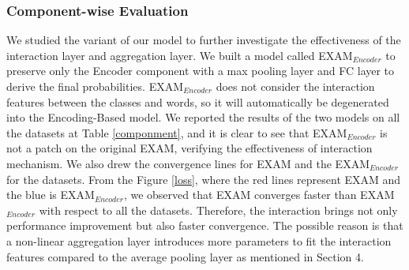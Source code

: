 \documentclass[letterpaper]{article} %
\begin{document}
\subsubsection{Component-wise Evaluation}
We studied the variant of our model to further investigate the effectiveness of the interaction layer and aggregation layer. We built a model called EXAM$_{Encoder}$ to preserve only the Encoder component with a max pooling layer and FC layer to derive the final probabilities. EXAM$_{Encoder}$ does not consider the interaction features between the classes and words, so it will automatically be degenerated into the Encoding-Based model. We reported the results of the two models on all the datasets at Table \ref{componment}, and it is clear to see that EXAM$_{Encoder}$ is not a patch on the original EXAM, verifying the effectiveness of interaction mechanism.
We also drew the convergence lines for EXAM and the EXAM$_{Encoder}$ for the datasets. From the Figure \ref{loss}, where the red lines represent EXAM and the blue is EXAM$_{Encoder}$, we observed that EXAM converges faster than EXAM$_{Encoder}$ with respect to all the datasets. Therefore, the interaction brings not only performance improvement but also faster convergence. The possible reason is that a non-linear aggregation layer introduces more parameters to fit the interaction features compared to the average pooling layer as mentioned in Section 4.
\end{document}

